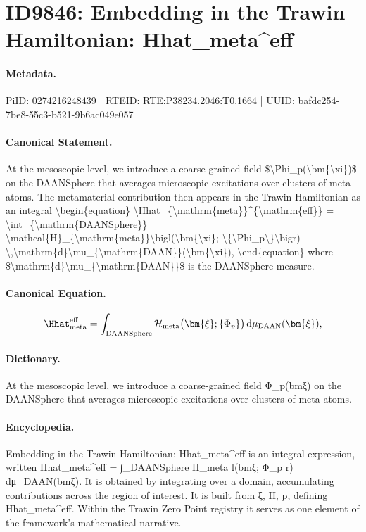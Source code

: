 \section*{ID9846: Embedding in the Trawin Hamiltonian: Hhat\_meta\textasciicircum{}eff}
\paragraph{Metadata.}
PiID: 0274216248439 | RTEID: RTE:P38234.2046:T0.1664 | UUID: bafdc254-7be8-55c3-b521-9b6ac049e057

\paragraph{Canonical Statement.}
At the mesoscopic level, we introduce a coarse-grained field \$\textbackslash{}Phi\_p(\textbackslash{}bm\{\textbackslash{}xi\})\$ on the DAANSphere that averages microscopic excitations over clusters of meta-atoms. The metamaterial contribution then appears in the Trawin Hamiltonian as an integral \textbackslash{}begin\{equation\} \textbackslash{}Hhat\_\{\textbackslash{}mathrm\{meta\}\}\textasciicircum{}\{\textbackslash{}mathrm\{eff\}\} = \textbackslash{}int\_\{\textbackslash{}mathrm\{DAANSphere\}\} \textbackslash{}mathcal\{H\}\_\{\textbackslash{}mathrm\{meta\}\}\textbackslash{}bigl(\textbackslash{}bm\{\textbackslash{}xi\}; \textbackslash{}\{\textbackslash{}Phi\_p\textbackslash{}\}\textbackslash{}bigr) \textbackslash{},\textbackslash{}mathrm\{d\}\textbackslash{}mu\_\{\textbackslash{}mathrm\{DAAN\}\}(\textbackslash{}bm\{\textbackslash{}xi\}), \textbackslash{}end\{equation\} where \$\textbackslash{}mathrm\{d\}\textbackslash{}mu\_\{\textbackslash{}mathrm\{DAAN\}\}\$ is the DAANSphere measure.

\paragraph{Canonical Equation.}
\[
\Hhat_{\mathrm{meta}}^{\mathrm{eff}} = \int_{\mathrm{DAANSphere}} \mathcal{H}_{\mathrm{meta}}\bigl(\bm{\xi}; \{\Phi_p\}\bigr) \,\mathrm{d}\mu_{\mathrm{DAAN}}(\bm{\xi}),
\]

\paragraph{Dictionary.}
At the mesoscopic level, we introduce a coarse-grained field Φ\_p(bmξ) on the DAANSphere that averages microscopic excitations over clusters of meta-atoms.

\paragraph{Encyclopedia.}
Embedding in the Trawin Hamiltonian: Hhat\_meta\textasciicircum{}eff is an integral expression, written Hhat\_meta\textasciicircum{}eff = ∫\_DAANSphere H\_meta l(bmξ; Φ\_p r) dμ\_DAAN(bmξ). It is obtained by integrating over a domain, accumulating contributions across the region of interest. It is built from ξ, H, p, defining Hhat\_meta\textasciicircum{}eff. Within the Trawin Zero Point registry it serves as one element of the framework's mathematical narrative.
